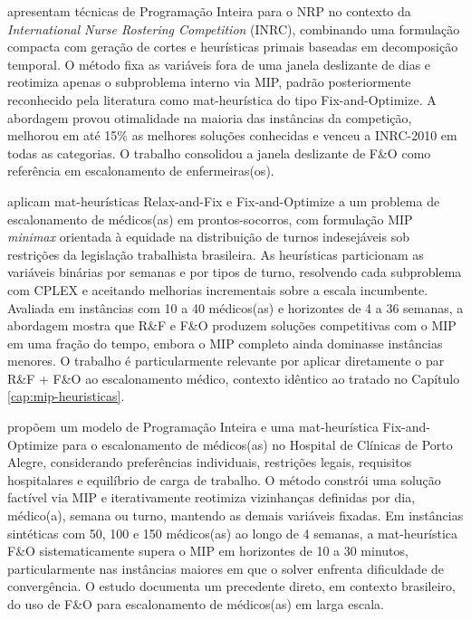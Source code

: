  apresentam técnicas de Programação Inteira para o NRP no contexto da \textit{International Nurse Rostering Competition} (INRC), combinando uma formulação compacta com geração de cortes e heurísticas primais baseadas em decomposição temporal. O método fixa as variáveis fora de uma janela deslizante de dias e reotimiza apenas o subproblema interno via MIP, padrão posteriormente reconhecido pela literatura como mat-heurística do tipo Fix-and-Optimize. A abordagem provou otimalidade na maioria das instâncias da competição, melhorou em até 15\% as melhores soluções conhecidas e venceu a INRC-2010 em todas as categorias. O trabalho consolidou a janela deslizante de F\&O como referência em escalonamento de enfermeiras(os).

 aplicam mat-heurísticas Relax-and-Fix e Fix-and-Optimize a um problema de escalonamento de médicos(as) em prontos-socorros, com formulação MIP \textit{minimax} orientada à equidade na distribuição de turnos indesejáveis sob restrições da legislação trabalhista brasileira. As heurísticas particionam as variáveis binárias por semanas e por tipos de turno, resolvendo cada subproblema com CPLEX e aceitando melhorias incrementais sobre a escala incumbente. Avaliada em instâncias com 10 a 40 médicos(as) e horizontes de 4 a 36 semanas, a abordagem mostra que R\&F e F\&O produzem soluções competitivas com o MIP em uma fração do tempo, embora o MIP completo ainda dominasse instâncias menores. O trabalho é particularmente relevante por aplicar diretamente o par R\&F + F\&O ao escalonamento médico, contexto idêntico ao tratado no Capítulo \ref{cap:mip-heuristicas}.

 propõem um modelo de Programação Inteira e uma mat-heurística Fix-and-Optimize para o escalonamento de médicos(as) no Hospital de Clínicas de Porto Alegre, considerando preferências individuais, restrições legais, requisitos hospitalares e equilíbrio de carga de trabalho. O método constrói uma solução factível via MIP e iterativamente reotimiza vizinhanças definidas por dia, médico(a), semana ou turno, mantendo as demais variáveis fixadas. Em instâncias sintéticas com 50, 100 e 150 médicos(as) ao longo de 4 semanas, a mat-heurística F\&O sistematicamente supera o MIP em horizontes de 10 a 30 minutos, particularmente nas instâncias maiores em que o solver enfrenta dificuldade de convergência. O estudo documenta um precedente direto, em contexto brasileiro, do uso de F\&O para escalonamento de médicos(as) em larga escala.

